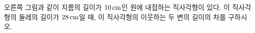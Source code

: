 \noindent\begin{minipage}[t]{0.58\linewidth}\vspace{0pt}\raggedright 오른쪽 그림과 같이 지름의 길이가 $10\mkern3mu \mathrm{cm}$인 원에 내접하는 직사각형이 있다. 이 직사각형의 둘레의 길이가 $28\mkern3mu \mathrm{cm}$일 때, 이 직사각형의 이웃하는 두 변의 길이의 차를 구하시오.\end{minipage}\hfill\begin{minipage}[t]{0.4\linewidth}\vspace{0pt}\centering \resizebox{\ifdim\width>\linewidth\linewidth\else\width\fi}{!}{}\end{minipage}\par
